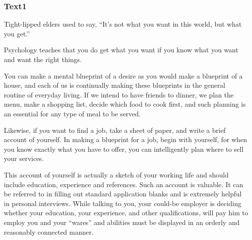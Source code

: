 \documentclass[a4paper]{article}
\begin{document}
\subsubsection{Text1}

\par
Tight-lipped elders used to say, “It’s not what you want in this world, but what you get.”

\par
Psychology teaches that you do get what you want if you know what you want and want the right things.

\par
You can make a mental blueprint of a desire as you would make a blueprint of a house, and each of us is continually making these blueprints in the general routine of everyday living. If we intend to have friends to dinner, we plan the menu, make a shopping list, decide which food to cook first, and such planning is an essential for any type of meal to be served.

\par
Likewise, if you want to find a job, take a sheet of paper, and write a brief account of yourself. In making a blueprint for a job, begin with yourself, for when you know exactly what you have to offer, you can intelligently plan where to sell your services.

\par
This account of yourself is actually a sketch of your working life and should include education, experience and references. Such an account is valuable. It can be referred to in filling out standard application blanks and is extremely helpful in personal interviews. While talking to you, your could-be employer is deciding whether your education, your experience, and other qualifications, will pay him to employ you and your “wares” and abilities must be displayed in an orderly and reasonably connected manner.
\end{document}
